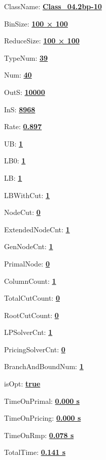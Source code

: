 \documentclass[11pt]{article}
\begin{document}
\pagestyle{empty}


ClassName: \underline{\textbf{Class_04.2bp-10}}
\par
BinSize: \underline{\textbf{100 × 100}}
\par
ReduceSize: \underline{\textbf{100 × 100}}
\par
TypeNum: \underline{\textbf{39}}
\par
Num: \underline{\textbf{40}}
\par
OutS: \underline{\textbf{10000}}
\par
InS: \underline{\textbf{8968}}
\par
Rate: \underline{\textbf{0.897}}
\par
UB: \underline{\textbf{1}}
\par
LB0: \underline{\textbf{1}}
\par
LB: \underline{\textbf{1}}
\par
LBWithCut: \underline{\textbf{1}}
\par
NodeCut: \underline{\textbf{0}}
\par
ExtendedNodeCnt: \underline{\textbf{1}}
\par
GenNodeCnt: \underline{\textbf{1}}
\par
PrimalNode: \underline{\textbf{0}}
\par
ColumnCount: \underline{\textbf{1}}
\par
TotalCutCount: \underline{\textbf{0}}
\par
RootCutCount: \underline{\textbf{0}}
\par
LPSolverCnt: \underline{\textbf{1}}
\par
PricingSolverCnt: \underline{\textbf{0}}
\par
BranchAndBoundNum: \underline{\textbf{1}}
\par
isOpt: \underline{\textbf{true}}
\par
TimeOnPrimal: \underline{\textbf{0.000 s}}
\par
TimeOnPricing: \underline{\textbf{0.000 s}}
\par
TimeOnRmp: \underline{\textbf{0.078 s}}
\par
TotalTime: \underline{\textbf{0.141 s}}
\par
\newpage
\end{document}
